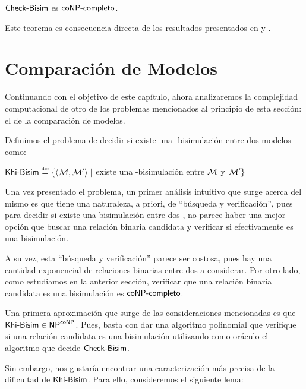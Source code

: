 \begin{teorema}
    $\rm\textsf{Check-Bisim}$ es $\rm\textsf{coNP-completo}$.
\end{teorema}

\begin{demostracion}
    Este teorema es consecuencia directa de los resultados presentados en  y . 
\end{demostracion}

\section{Comparación de Modelos}

Continuando con el objetivo de este capítulo, ahora analizaremos la complejidad computacional de otro de los problemas mencionados al 
principio de esta sección: el de la comparación de modelos.

\begin{definicion}
    Definimos el problema de decidir si existe una \KHilogic-bisimulación entre dos modelos como:
    \begin{center}
        $\KHiBisim \eqdef \{\tup{\modults,\modults'} \mid$ existe una \KHilogic-bisimulación
        entre $\mathcal{M}$ y $\mathcal{M}'\}$
    \end{center}
\end{definicion}

Una vez presentado el problema, un primer análisis intuitivo que surge acerca
del mismo es que tiene una naturaleza, a priori, de ``búsqueda y verificación'', pues
para decidir si existe una bisimulación entre dos \ultss, no parece haber una mejor
opción que buscar una relación binaria candidata y verificar si efectivamente es una bisimulación. 

A su vez, esta ``búsqueda y verificación'' parece ser costosa, pues hay una cantidad exponencial de relaciones binarias
entre dos \ultss a considerar. Por otro lado, como estudiamos en la anterior sección, verificar que una relación binaria 
candidata es una bisimulación es $\rm\textsf{coNP-completo}$. 

Una primera aproximación que surge de las consideraciones mencionadas es que $\rm\textsf{Khi-Bisim} \in \rm\textsf{NP}^{\rm\textsf{coNP}}$. Pues, basta con dar una 
algoritmo polinomial que verifique si una relación candidata es una bisimulación utilizando como oráculo el algoritmo que decide 
$\rm\textsf{Check-Bisim}$.

Sin embargo, nos gustaría encontrar una caracterización más precisa de la dificultad de $\rm\textsf{Khi-Bisim}$. Para ello, consideremos el siguiente 
lema:

